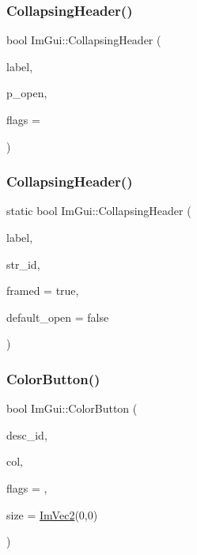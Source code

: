 \subsubsection{\texorpdfstring{Collapsing\+Header()}{CollapsingHeader()}\hspace{0.1cm}{\footnotesize\ttfamily [2/3]}}
{\footnotesize\ttfamily bool Im\+Gui\+::\+Collapsing\+Header (\begin{DoxyParamCaption}\item[{const char $\ast$}]{label,  }\item[{bool $\ast$}]{p\+\_\+open,  }\item[{Im\+Gui\+Tree\+Node\+Flags}]{flags = {} }\end{DoxyParamCaption})}

\hypertarget{namespace_im_gui_a9c09b5eb6ecddb39c6374f1323e88cf3}{}\label{namespace_im_gui_a9c09b5eb6ecddb39c6374f1323e88cf3} 
\subsubsection{\texorpdfstring{Collapsing\+Header()}{CollapsingHeader()}\hspace{0.1cm}{\footnotesize\ttfamily [3/3]}}
{\footnotesize\ttfamily static bool Im\+Gui\+::\+Collapsing\+Header (\begin{DoxyParamCaption}\item[{const char $\ast$}]{label,  }\item[{const char $\ast$}]{str\+\_\+id,  }\item[{bool}]{framed = {\ttfamily true},  }\item[{bool}]{default\+\_\+open = {\ttfamily false} }\end{DoxyParamCaption})\hspace{0.3cm}{\ttfamily [static]}}

\hypertarget{namespace_im_gui_a82b18bfe08594b76c08894848d1e6fce}{}\label{namespace_im_gui_a82b18bfe08594b76c08894848d1e6fce} 
\subsubsection{\texorpdfstring{Color\+Button()}{ColorButton()}}
{\footnotesize\ttfamily bool Im\+Gui\+::\+Color\+Button (\begin{DoxyParamCaption}\item[{const char $\ast$}]{desc\+\_\+id,  }\item[{const \hyperlink{struct_im_vec4}{Im\+Vec4} \&}]{col,  }\item[{Im\+Gui\+Color\+Edit\+Flags}]{flags = {},  }\item[{\hyperlink{struct_im_vec2}{Im\+Vec2}}]{size = {\ttfamily \hyperlink{struct_im_vec2}{Im\+Vec2}(0,0)} }\end{DoxyParamCaption})}

